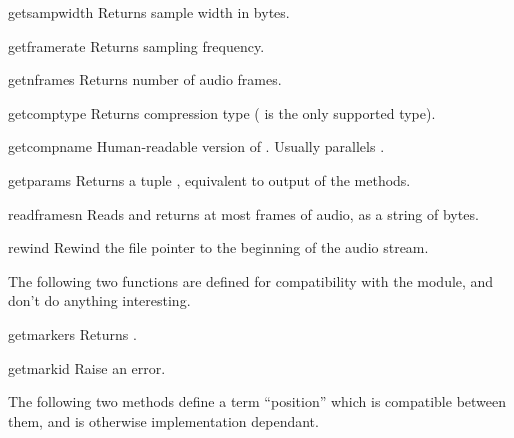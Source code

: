 \begin{methoddesc}{getsampwidth}{}
Returns sample width in bytes.
\end{methoddesc}

\begin{methoddesc}{getframerate}{}
Returns sampling frequency.
\end{methoddesc}

\begin{methoddesc}{getnframes}{}
Returns number of audio frames.
\end{methoddesc}

\begin{methoddesc}{getcomptype}{}
Returns compression type ( is the only supported type).
\end{methoddesc}

\begin{methoddesc}{getcompname}{}
Human-readable version of .
Usually  parallels .
\end{methoddesc}

\begin{methoddesc}{getparams}{}
Returns a tuple
,
equivalent to output of the  methods.
\end{methoddesc}

\begin{methoddesc}{readframes}{n}
Reads and returns at most  frames of audio, as a string of bytes.
\end{methoddesc}

\begin{methoddesc}{rewind}{}
Rewind the file pointer to the beginning of the audio stream.
\end{methoddesc}

The following two functions are defined for compatibility with the
 module, and don't do anything interesting.

\begin{methoddesc}{getmarkers}{}
Returns .
\end{methoddesc}

\begin{methoddesc}{getmark}{id}
Raise an error.
\end{methoddesc}

The following two methods define a term ``position'' which is compatible
between them, and is otherwise implementation dependant.

